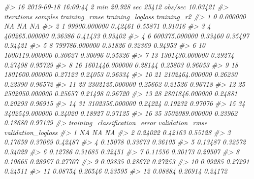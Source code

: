 \documentclass[]{book}
\newenvironment{Shaded}{\begin{snugshade}}{\end{snugshade}}
\newcommand{\CommentTok}[1]{\textcolor[rgb]{0.56,0.35,0.01}{\textit{#1}}}
\begin{document}
\begin{Shaded}
\begin{Highlighting}[]
{{{{{{{{{{{{{{{{{{{{{{{{{{{{{{{{{{{{{{{{{\CommentTok{#> 16 2019-09-18 16:09:44  2 min 20.928 sec  25412 obs/sec 10.03421}
\CommentTok{#>    iterations        samples training_rmse training_logloss training_r2}
\CommentTok{#> 1           0       0.000000            NA               NA          NA}
\CommentTok{#> 2           1   99900.000000       0.42461          0.55871     0.91016}
\CommentTok{#> 3           4  400265.000000       0.36386          0.41433     0.93402}
\CommentTok{#> 4           6  600375.000000       0.33460          0.35497     0.94421}
\CommentTok{#> 5           8  799786.000000       0.31826          0.32369     0.94953}
\CommentTok{#> 6          10 1000119.000000       0.30627          0.30096     0.95326}
\CommentTok{#> 7          13 1301430.000000       0.29274          0.27498     0.95729}
\CommentTok{#> 8          16 1601446.000000       0.28144          0.25803     0.96053}
\CommentTok{#> 9          18 1801600.000000       0.27123          0.24053     0.96334}
\CommentTok{#> 10         21 2102464.000000       0.26230          0.22390     0.96572}
\CommentTok{#> 11         23 2302125.000000       0.25662          0.21526     0.96718}
\CommentTok{#> 12         25 2502050.000000       0.25657          0.21498     0.96720}
\CommentTok{#> 13         28 2801846.000000       0.24881          0.20293     0.96915}
\CommentTok{#> 14         31 3102356.000000       0.24224          0.19232     0.97076}
\CommentTok{#> 15         34 3402549.000000       0.24020          0.18927     0.97125}
\CommentTok{#> 16         35 3502089.000000       0.23962          0.18680     0.97139}
\CommentTok{#>    training_classification_error validation_rmse validation_logloss}
\CommentTok{#> 1                             NA              NA                 NA}
\CommentTok{#> 2                        0.24022         0.42163            0.55128}
\CommentTok{#> 3                        0.17659         0.37069            0.42487}
\CommentTok{#> 4                        0.15078         0.33673            0.36105}
\CommentTok{#> 5                        0.13487         0.32572            0.34029}
\CommentTok{#> 6                        0.12786         0.31685            0.32451}
\CommentTok{#> 7                        0.11556         0.30173            0.29507}
\CommentTok{#> 8                        0.10665         0.28967            0.27707}
\CommentTok{#> 9                        0.09835         0.28672            0.27253}
\CommentTok{#> 10                       0.09285         0.27291            0.24511}
\CommentTok{#> 11                       0.08754         0.26546            0.23595}
\CommentTok{#> 12                       0.08884         0.26914            0.24172}
}}}}}}}}}}}}}}}}}}}}}}}}}}}}}}}}}}}}}}}}}
\end{Highlighting}
\end{Shaded}
\end{document}
